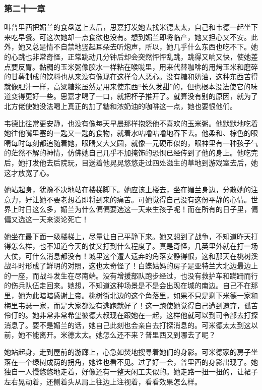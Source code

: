 \subsubsection{第二十一章}

\par 叫普里西把媚兰的食盘送上去后，思嘉打发她去找米德太太，自己和韦德一起坐下来吃早餐。可这次她却一点食欲也没有。想到媚兰即将临产，她又担心又不安。此外，她又总是情不自禁地竖起耳朵去听炮声，所以，她几乎什么东西也吃不下。她的心跳也非常奇怪，正常跳动几分钟后却会突然怦怦乱跳，跳得又响又快，使她差点要反胃。黏稠的玉米粥像胶水一样粘在喉咙里，用来代替咖啡的用烤玉米和磨碎的甘薯制成的饮料也从来没有像现在这样令人恶心。没有糖和奶油，这种东西苦得就像胆汁一样，高粱糖浆虽然是用来使东西“长久发甜”的，但也根本没法使它的味道变得更好一些。思嘉才喝了一口，就把杯子推开了。就算没有别的原因，就为了北方佬使她没法喝上真正的加了糖和浓奶油的咖啡这一点，她也要恨他们。
\par 韦德比往常更安静，也没有像每天早晨那样抱怨他不喜欢的玉米粥。他默默地吃着她往他嘴里塞的一匙又一匙的食物，就着水咕噜咕噜地吞下去。他柔和、棕色的眼睛每时每刻都追随着她，眼睛又大又圆，就像一元硬币似的，眼神里有一种孩子气的茫然不解的神情，仿佛她自己几乎不加掩饰的恐惧已经传到了他的身上。他吃完后，她打发他去后院玩，目送着他晃晃悠悠走过四处滋生的草地到游戏室去后，她这才放宽了心。
\par 她站起身，犹豫不决地站在楼梯脚下。她应该上楼去，坐在媚兰身边，分散她的注意力，好让她不要老想着即将到来的痛苦。可她觉得自己没有这份平静的心情。世界上时日这么多，媚兰为什么偏偏要选这一天来生孩子呢！而在所有的日子里，偏偏又选这一天来谈论死亡！
\par 她坐在最下面一级楼梯上，尽量让自己平静下来。她又想到了战争，不知道昨天打得怎么样，也不知道今天的仗又打到什么程度了。真是奇怪，几英里外就在打一场大仗，可什么消息都没有！城里这个遭人遗弃的角落安静得很，这和那天在桃树溪战斗时形成了鲜明的对照，这也太奇怪了！白蝶姑妈的房子是亚特兰大北边最边上的一座，而战斗发生在尽南端。没有增援部队跑步经过，也没有救护车和蹒跚而行的伤兵队伍走回来。她想，不知道这种场景是不是会出现在城的南边。自己不在那里，她为此暗暗感谢上帝。桃树街北边的这个角落里，如果不只是剩下米德一家和梅里韦瑟一家，而是大家都没有逃跑就好了！这一跑使她觉得自己遭到遗弃，孤苦伶仃的。她非常非常希望彼德大叔现在跟她在一起，这样他就可以到司令部去打探消息了。要不是媚兰的话，她自己此刻也会亲自去打探消息的。可米德太太到这以前，她不能离开。米德太太。她怎么还不来？普里西又到哪去了呢？
\par 她站起身，走到屋前的游廊上，心急如焚地搜寻着她们的身影。可米德家的房子坐落在一个绿树成荫的拐角，她谁也看不见。过了好一会，普里西的身影出现了。她独自一人慢悠悠地走着，好像还有一整天闲工夫似的。她走路一扭一扭的，让裙子左右晃动着，还侧着头从肩上往边上注视着，看看效果怎么样。
